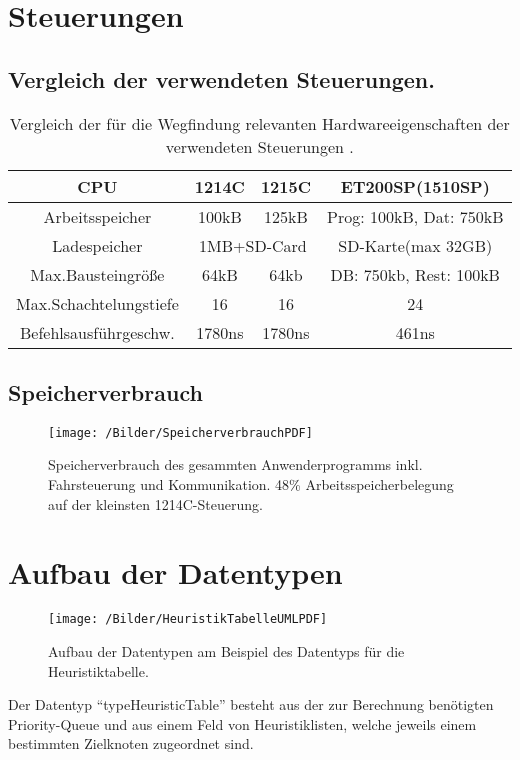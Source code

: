 \section{Steuerungen}
	
	\subsection{Vergleich der verwendeten Steuerungen.}
	
	\begin{table}[H]
		\centering
		\begin{longtable}{| c || c | c | c |}
			\hline
			CPU & 1214C & 1215C & ET200SP(1510SP)\\ \hline
			Arbeitsspeicher & 100kB & 125kB & Prog: 100kB, Dat: 750kB\\ \hline
			Ladespeicher & \multicolumn{2}{c|}{1MB+SD-Card} & SD-Karte(max 32GB)\\ \hline
			Max.Bausteingröße & 64kB & 64kb & DB: 750kb, Rest: 100kB\\ \hline
			Max.Schachtelungstiefe & 16 & 16 & 24 \\ \hline
			Befehlsausführgeschw. & 1780ns & 1780ns & 461ns\\ \hline
		\end{longtable}
		\vspace{0.2cm}
		\caption{Vergleich der für die Wegfindung relevanten Hardwareeigenschaften der verwendeten Steuerungen \cite{S7-1200}\cite{ET200SP}.}
	\end{table}	
		

	\subsection{Speicherverbrauch}
	
	\begin{figure}[H]
		\centering
		\texttt{[image: /Bilder/SpeicherverbrauchPDF]}
		\vspace{0.2cm}
		\caption{Speicherverbrauch des gesammten Anwenderprogramms inkl. Fahrsteuerung und Kommunikation. 48\% Arbeitsspeicherbelegung auf der kleinsten 1214C-Steuerung.}
	\end{figure}

\section{Aufbau der Datentypen}

	\begin{figure}[h]
		\centering
		\texttt{[image: /Bilder/HeuristikTabelleUMLPDF]}
		\vspace{0.2cm}
		\caption{Aufbau der Datentypen am Beispiel des Datentyps für die Heuristiktabelle.}
	\end{figure}
	 Der Datentyp "`typeHeuristicTable"' besteht aus der zur Berechnung benötigten Priority-Queue und aus einem Feld von Heuristiklisten, welche jeweils einem bestimmten Zielknoten zugeordnet sind.
	
